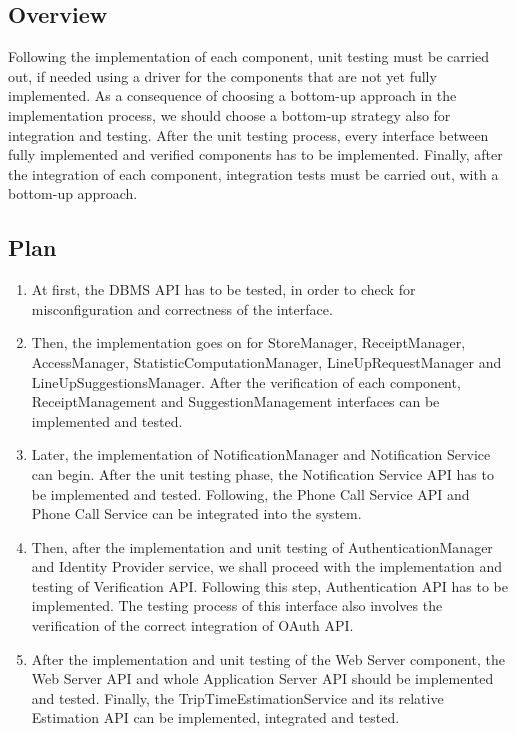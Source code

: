 \documentclass[../../main.tex]{subfiles}
\begin{document}
\subsection{Overview}

Following the implementation of each component, unit testing must be carried out, if needed using a driver for the components that are not yet fully implemented. 
As a consequence of choosing a bottom-up approach in the implementation process, we should choose a bottom-up strategy also for integration and testing. 
After the unit testing process, every interface between fully implemented and verified components has to be implemented. 
Finally, after the integration of each component, integration tests must be carried out, with a bottom-up approach. 

\subsection{Plan}

\begin{enumerate}

	\item At first, the DBMS API has to be tested, in order to check for misconfiguration and correctness of the interface.

	\item Then, the implementation goes on for StoreManager, ReceiptManager, AccessManager, StatisticComputationManager, LineUpRequestManager and LineUpSuggestionsManager. 
	After the verification of each component, ReceiptManagement and SuggestionManagement interfaces can be implemented and tested.

	\item Later, the implementation of NotificationManager and Notification Service can begin. 
	After the unit testing phase, the Notification Service API has to be implemented and tested. 
	Following, the Phone Call Service API and Phone Call Service can be integrated into the system.

	\item Then, after the implementation and unit testing of AuthenticationManager and Identity Provider service, we shall proceed with the implementation and testing of Verification API. 
	Following this step, Authentication API has to be implemented. The testing process of this interface also involves the verification of the correct integration of OAuth API.

	\item After the implementation and unit testing of the Web Server component, the Web Server API and whole Application Server API should be implemented and tested. 
	Finally, the TripTimeEstimationService and its relative Estimation API can be implemented, integrated and tested.

\end{enumerate}
\end{document}
